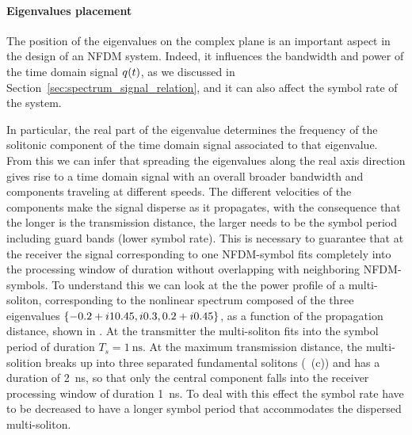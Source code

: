 \paragraph{Eigenvalues placement}\label{par:eigenvalue_placement}

The position of the eigenvalues on the complex plane is an important aspect in the design of an \ac{NFDM} system. Indeed, it influences the bandwidth and power of the time domain signal $q_{} (t)$, as we discussed in Section~\ref{sec:spectrum_signal_relation}, and it can also affect the symbol rate of the system.

In particular, the real part of the eigenvalue determines the frequency of the solitonic
component of the time domain signal associated to that eigenvalue. From this we can infer that spreading the eigenvalues
along the real axis direction gives rise to a time domain signal with an
overall broader bandwidth and components traveling
at different speeds. The different velocities of the components make the signal disperse as it propagates, with the consequence
that the longer is the transmission distance, the larger needs to be the symbol period \Ts{} including guard bands (lower
symbol rate). This is necessary to guarantee that at the receiver the signal corresponding to one \ac{NFDM}-symbol fits
completely into the processing window of duration \Ts{} without overlapping with neighboring \ac{NFDM}-symbols. To understand this we can look at the
the power profile of a multi-soliton, corresponding to the nonlinear spectrum composed of the three eigenvalues $\{-0.2+ i 10.45, i 0.3, 0.2+ i 0.45\}$, as a function of the propagation distance, shown in . At the transmitter the multi-soliton fits into the  symbol period of duration $T_s = \SI{1}{\ns}$.
At the maximum transmission distance, the multi-solition breaks up into three separated fundamental solitons (~(c)) and has a duration of \SI{2}{\ns}, so that only the central component falls into the receiver processing window of duration \SI{1}{\ns}.
To deal with this effect the symbol rate have to be decreased to have a longer symbol
period that accommodates the dispersed multi-soliton.

